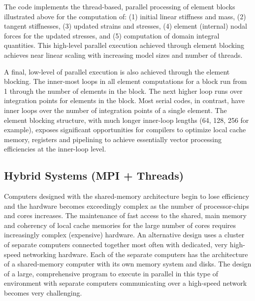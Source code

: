 The code implements the thread-based, parallel processing of element blocks illustrated 
above for the computation of: (1) initial linear stiffness and mass, (2) tangent 
stiffnesses, (3) updated strains and stresses, (4) element (internal) nodal forces 
for the updated stresses, and (5)  computation of domain integral quantities.
This high-level parallel execution achieved through 
element blocking achieves near linear scaling with increasing 
model sizes and number of threads.

A final, low-level of parallel execution is also achieved through the element 
blocking. The inner-most loops in all element computations for a block run 
from 1 through the number of elements in the block. The next higher loop runs over
integration points for elements in the block. Most serial codes, 
in contrast, have inner loops over the number of integration points of a single element. 
The element blocking structure, with much longer inner-loop 
lengths (64, 128, 256 for example), exposes significant opportunities 
for compilers to optimize local cache memory, registers and pipelining 
to achieve essentially vector processing efficiencies at the inner-loop level.

\subsection {Hybrid Systems (MPI + Threads)}
\nin Computers designed with the shared-memory architecture begin to 
lose efficiency and the hardware becomes exceedingly complex as the 
number of processor-chips and cores increases. The maintenance of fast 
access to the shared, main memory and coherency of local cache 
memories for the large number of cores requires increasingly complex 
(expensive) hardware. An alternative design uses a cluster of separate 
computers connected together most often with dedicated, very high-speed 
networking hardware. Each of the separate computers has the architecture 
of a shared-memory computer with its own memory system and disks. 
The design of a large, comprehensive program to execute in parallel 
in this type of environment with separate computers communicating 
over a high-speed network becomes very challenging. 

